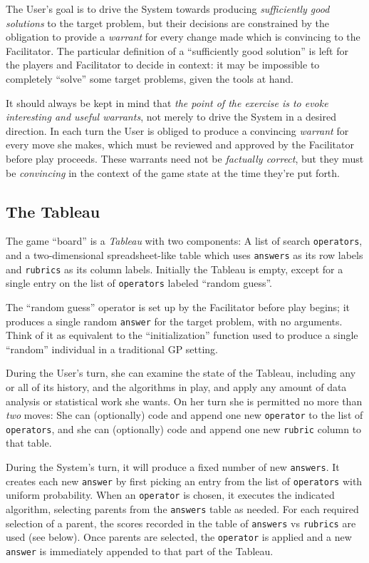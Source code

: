 The User's goal is to drive the System towards producing \emph{sufficiently good solutions} to the target problem, but their decisions are constrained by the obligation to provide a \emph{warrant} for every change made which is convincing to the Facilitator. The particular definition of a ``sufficiently good solution'' is left for the players and Facilitator to decide in context: it may be impossible to completely ``solve'' some target problems, given the tools at hand.

It should always be kept in mind that \emph{the point of the exercise is to evoke interesting and useful warrants}, not merely to drive the System in a desired direction. In each turn the User is obliged to produce a convincing \emph{warrant} for every move she makes, which must be reviewed and approved by the Facilitator before play proceeds. These warrants need not be \emph{factually correct}, but they must be \emph{convincing} in the context of the game state at the time they're put forth.

\subsection{The Tableau}\hypertarget{the-tableau}{}\label{the-tableau}

The game ``board'' is a \emph{Tableau} with two components: A list of search {\tt operators}, and a two-dimensional spreadsheet-like table which uses {\tt answers} as its row labels and {\tt rubrics} as its column labels. Initially the Tableau is empty, except for a single entry on the list of {\tt operators} labeled ``random guess''.

The ``random guess'' operator is set up by the Facilitator before play begins; it produces a single random {\tt answer} for the target problem, with no arguments. Think of it as equivalent to the ``initialization'' function used to produce a single ``random'' individual in a traditional GP setting.

During the User's turn, she can examine the state of the Tableau, including any or all of its history, and the algorithms in play, and apply any amount of data analysis or statistical work she wants. On her turn she is permitted no more than \emph{two} moves: She can (optionally) code and append one new {\tt operator} to the list of {\tt operators}, and she can (optionally) code and append one new {\tt rubric} column to that table.

During the System's turn, it will produce a fixed number of new {\tt answers}. It creates each new {\tt answer} by first picking an entry from the list of {\tt operators} with uniform probability. When an {\tt operator} is chosen, it executes the indicated algorithm, selecting parents from the {\tt answers} table as needed. For each required selection of a parent, the scores recorded in the table of {\tt answers} vs {\tt rubrics} are used (see below). Once parents are selected, the {\tt operator} is applied and a new {\tt answer} is immediately appended to that part of the Tableau.

